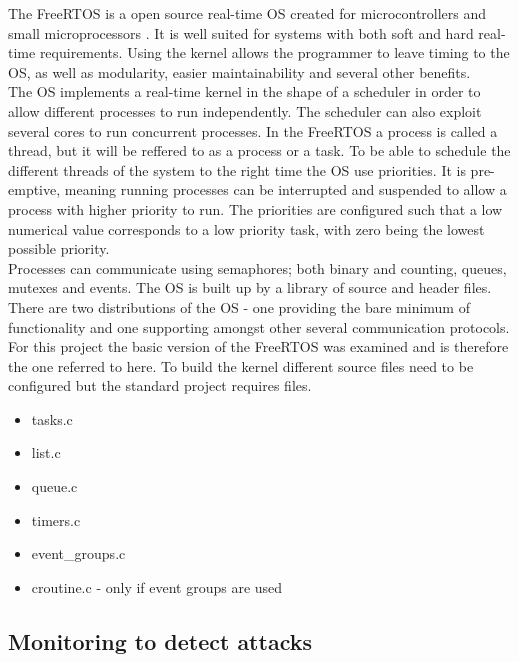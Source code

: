 The FreeRTOS is a open source real-time OS created for microcontrollers and small microprocessors \cite{manual:freeRTOS}. It is well suited for systems with both soft and hard real-time requirements. Using the kernel allows the programmer to leave timing to the OS, as well as modularity, easier maintainability and several other benefits.\\

The OS implements a real-time kernel in the shape of a scheduler in order to allow different processes to run independently. The scheduler can also exploit several cores to run concurrent processes. In the FreeRTOS a process is called a thread, but it will be reffered to as a process or a task. To be able to schedule the different threads of the system to the right time the OS use priorities. It is pre-emptive, meaning running processes can be interrupted and suspended to allow a process with higher priority to run. The priorities are configured such that a low numerical value corresponds to a low priority task, with zero being the lowest possible priority.\\

Processes can communicate using semaphores; both binary and counting, queues, mutexes and events. The OS is built up by a library of source and header files. There are two distributions of the OS - one providing the bare minimum of functionality and one supporting amongst other several communication protocols. For this project the basic version of the FreeRTOS was examined and is therefore the one referred to here. To build the kernel different source files need to be configured but the standard project requires files.\\

\begin{itemize}
    \item tasks.c
    \item list.c
    \item queue.c
    \item timers.c
    \item event\_groups.c
    \item croutine.c - only if event groups are used
\end{itemize}
 


\subsection{Monitoring to detect attacks} \label{chap:freertos_monitor}

